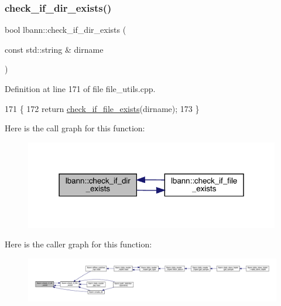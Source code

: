 \subsubsection{\texorpdfstring{check\+\_\+if\+\_\+dir\+\_\+exists()}{check\_if\_dir\_exists()}}
{\footnotesize\ttfamily bool lbann\+::check\+\_\+if\+\_\+dir\+\_\+exists (\begin{DoxyParamCaption}\item[{const std\+::string \&}]{dirname }\end{DoxyParamCaption})}



Definition at line 171 of file file\+\_\+utils.\+cpp.


\begin{DoxyCode}
171                                                    \{
172   \textcolor{keywordflow}{return} \hyperlink{namespacelbann_a4fac6c6483965395fa79d31061485f9f}{check\_if\_file\_exists}(dirname);
173 \}
\end{DoxyCode}
Here is the call graph for this function\+:\nopagebreak
\begin{figure}[H]
\begin{center}
\leavevmode
\includegraphics[width=316pt]{namespacelbann_a3ee4a1fa7a82c30999de9eb626c68311_cgraph}
\end{center}
\end{figure}
Here is the caller graph for this function\+:\nopagebreak
\begin{figure}[H]
\begin{center}
\leavevmode
\includegraphics[width=350pt]{namespacelbann_a3ee4a1fa7a82c30999de9eb626c68311_icgraph}
\end{center}
\end{figure}
\mbox{\label{namespacelbann_a4fac6c6483965395fa79d31061485f9f}} 
